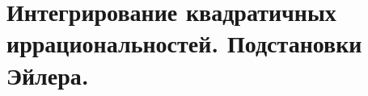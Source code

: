 \documentclass[../main.tex]{subfiles}
\begin{document}
\newpage
\section{Интегрирование квадратичных иррациональностей. Подстановки Эйлера.}
\end{document}

